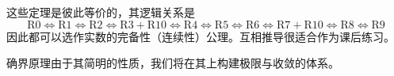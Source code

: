 这些定理是彼此等价的，其逻辑关系是
\[ \mathrm{R0} \Leftrightarrow \mathrm{R1} \Leftrightarrow\mathrm{R2} \Leftrightarrow\mathrm{R3} + \mathrm{R10} \Leftrightarrow\mathrm{R4} \Leftrightarrow\mathrm{R5} \Leftrightarrow\mathrm{R6} \Leftrightarrow\mathrm{R7}+\mathrm{R10} \Leftrightarrow\mathrm{R8} \Leftrightarrow\text{R9}  \]
因此都可以选作实数的完备性（连续性）公理。互相推导很适合作为课后练习。

确界原理由于其简明的性质，我们将在其上构建极限与收敛的体系。







%
%
%
%
%
%
%
%
%	
%	
%
%
%
